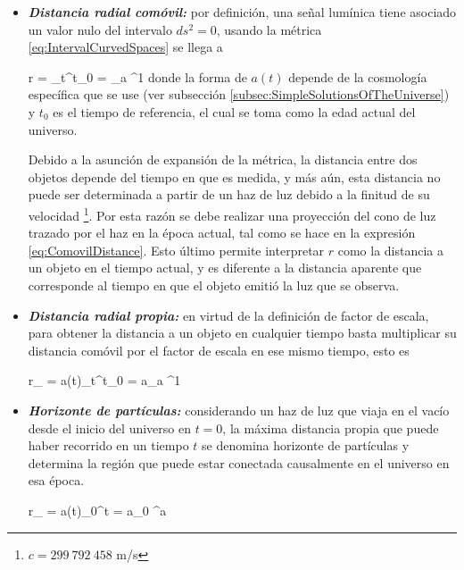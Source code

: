 \begin{itemize}
\item \textit{\textbf{Distancia radial comóvil:}} por definición, una señal 
lumínica tiene asociado un valor nulo del intervalo $ds^2 = 0$, usando la 
métrica \ref{eq:IntervalCurvedSpaces} se llega a


{ r = \int_t^{t_0}  = \int_a ^1  }
donde la forma de $a(t)$ depende de la cosmología específica que se use
(ver subsección \ref{subsec:SimpleSolutionsOfTheUniverse}) y $t_0$ es el 
tiempo de referencia, el cual se toma como la edad actual del universo. 


Debido a la asunción de expansión de la métrica, la distancia entre dos 
objetos depende del tiempo en que es medida, y más aún, esta distancia no 
puede ser determinada a partir de un haz de luz debido a la finitud de su
velocidad \footnote{$c=299\ 792\ 458$ m/s}. Por esta razón se debe 
realizar una proyección del cono de luz trazado por el haz en la época 
actual, tal como se hace en la expresión \ref{eq:ComovilDistance}. Esto 
último permite interpretar $r$ como la distancia a un objeto en el tiempo
actual, y es diferente a la distancia aparente que corresponde al 
tiempo en que el objeto emitió la luz que se observa.


\item \textit{\textbf{Distancia radial propia:}} en virtud de la definición
de factor de escala, para obtener la distancia a un objeto en cualquier 
tiempo basta multiplicar su distancia comóvil por el factor de escala en 
ese mismo tiempo, esto es


{ r_{} = a(t)\int_t^{t_0}  = 
a\int_a ^1  }


\item \textit{\textbf{Horizonte de partículas:}} considerando un haz de 
luz que viaja en el vacío desde el inicio del universo en $t=0$, la máxima 
distancia propia que puede haber recorrido en un tiempo $t$ se denomina 
horizonte de partículas y determina la región que puede estar conectada 
causalmente en el universo en esa época.


{ r_{} = a(t)\int_0^{t}  = 
a\int_0 ^a  }

\end{itemize}
